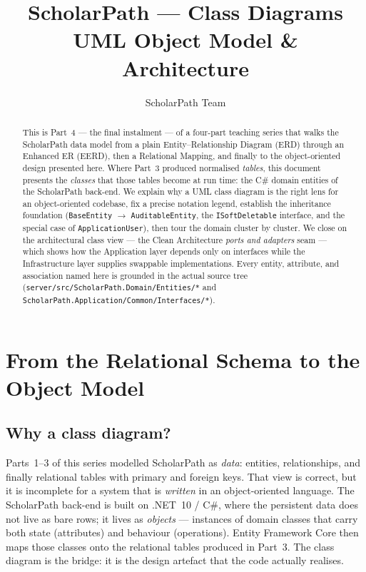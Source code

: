 \documentclass[11pt,a4paper]{article}
\title{ScholarPath --- Class Diagrams\\\large UML Object Model \& Architecture}
\author{ScholarPath Team}
\date{}
\begin{document}
\maketitle

\begin{abstract}
This is Part~4 --- the final instalment --- of a four-part teaching series that
walks the ScholarPath data model from a plain Entity--Relationship Diagram (ERD)
through an Enhanced ER (EERD), then a Relational Mapping, and finally to the
object-oriented design presented here. Where Part~3 produced normalised
\emph{tables}, this document presents the \emph{classes} that those tables
become at run time: the C\# domain entities of the ScholarPath back-end. We
explain why a UML class diagram is the right lens for an object-oriented
codebase, fix a precise notation legend, establish the inheritance foundation
(\texttt{BaseEntity} $\rightarrow$ \texttt{AuditableEntity}, the
\texttt{ISoftDeletable} interface, and the special case of
\texttt{ApplicationUser}), then tour the domain cluster by cluster. We close on
the architectural class view --- the Clean Architecture \emph{ports and
adapters} seam --- which shows how the Application layer depends only on
interfaces while the Infrastructure layer supplies swappable implementations.
Every entity, attribute, and association named here is grounded in the actual
source tree (\texttt{server/src/ScholarPath.Domain/Entities/*} and
\texttt{ScholarPath.Application/Common/Interfaces/*}).
\end{abstract}

\tableofcontents

\section{From the Relational Schema to the Object Model}

\subsection{Why a class diagram?}

Parts~1--3 of this series modelled ScholarPath as \emph{data}: entities,
relationships, and finally relational tables with primary and foreign keys. That
view is correct, but it is incomplete for a system that is \emph{written} in an
object-oriented language. The ScholarPath back-end is built on .NET~10 / C\#,
where the persistent data does not live as bare rows; it lives as
\emph{objects} --- instances of domain classes that carry both state
(attributes) and behaviour (operations). Entity Framework Core then maps those
classes onto the relational tables produced in Part~3. The class diagram is the
bridge: it is the design artefact that the code actually realises.
\end{document}
